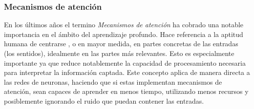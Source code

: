 \subsubsection{Mecanismos de atención}

En los últimos años el termino \textit{Mecanismos de atención} ha cobrado una
notable importancia en el ámbito del aprendizaje profundo. Hace referencia a la aptitud
humana de centrarse  , o en mayor medida, en partes concretas de las
entradas (los sentidos), idealmente en las partes más relevantes. Esto es
especialmente importante ya que reduce notablemente la capacidad de
procesamiento necesaria para interpretar la información captada. Este concepto
aplica de manera directa a las redes de neuronas, haciendo que si estas
implementan mecanismos de atención, sean capaces de aprender en menos tiempo,
utilizando menos recursos y posiblemente ignorando el ruido que puedan contener
las entradas.  

